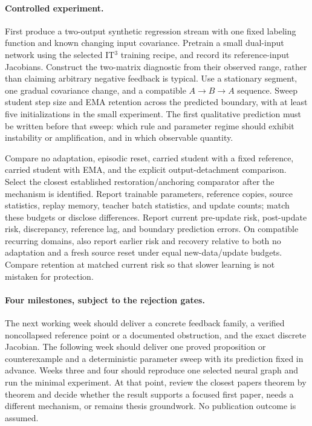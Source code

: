 \documentclass[11pt,a4paper]{article}
\begin{document}
\paragraph{Controlled experiment.}
First produce a two-output synthetic regression stream with one fixed
labeling function and known changing input covariance. Pretrain a small
dual-input network using the selected IT$^3$ training recipe, and record its
reference-input Jacobians. Construct the two-matrix diagnostic from their
observed range, rather than claiming arbitrary negative feedback is typical.
Use a stationary segment, one gradual covariance change, and a compatible
$A\to B\to A$ sequence. Sweep student step size and EMA retention across
the predicted boundary, with at least five initializations in the small
experiment. The first qualitative prediction must be written before that
sweep: which rule and parameter regime should exhibit instability or
amplification, and in which observable quantity.

Compare no adaptation, episodic reset, carried student with a fixed
reference, carried student with EMA, and the explicit output-detachment
comparison. Select the closest established restoration/anchoring comparator
after the mechanism is identified. Report trainable parameters, reference
copies, source statistics, replay memory, teacher batch statistics, and
update counts; match these budgets or disclose differences. Report current
pre-update risk, post-update risk, discrepancy, reference lag, and boundary
prediction errors. On compatible recurring domains, also report earlier
risk and recovery relative to both no adaptation and a fresh source reset
under equal new-data/update budgets. Compare retention at matched current
risk so that slower learning is not mistaken for protection.

\paragraph{Four milestones, subject to the rejection gates.}
The next working week should deliver a concrete feedback family, a verified
noncollapsed reference point or a documented obstruction, and the exact
discrete Jacobian. The following week should deliver one proved proposition
or counterexample and a deterministic parameter sweep with its prediction
fixed in advance. Weeks three and four should reproduce one selected neural
graph and run the minimal experiment. At that point, review the closest
papers theorem by theorem and decide whether the result supports a focused
first paper, needs a different mechanism, or remains thesis groundwork.
No publication outcome is assumed.
\end{document}

